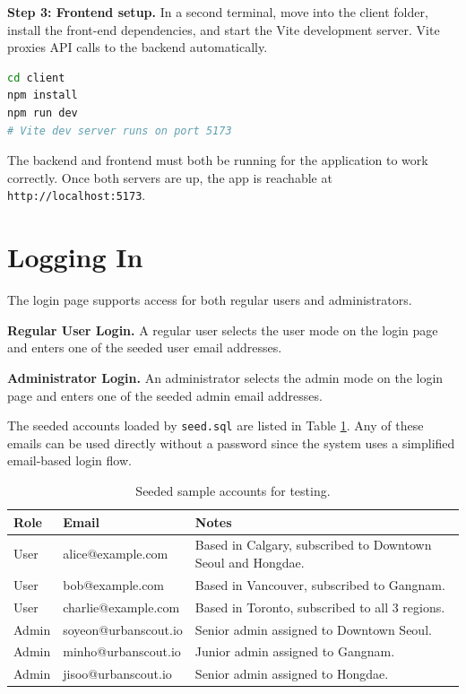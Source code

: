 \documentclass[11pt,letterpaper]{article}
\let\oldtexttt\texttt
\renewcommand{\texttt}[1]{{\color{inlinecode}\oldtexttt{#1}}}
\newcommand{\boldheading}[1]{\needspace{6\baselineskip}\noindent\textbf{#1}}
\begin{document}
\boldheading{Step 3: Frontend setup.} In a second terminal, move into the client folder, install the front-end dependencies, and start the Vite development server. Vite proxies API calls to the backend automatically.

\begin{lstlisting}[language=Bash]
cd client
npm install
npm run dev
# Vite dev server runs on port 5173
\end{lstlisting}

The backend and frontend must both be running for the application to work correctly. Once both servers are up, the app is reachable at \texttt{http://localhost:5173}.

\section{Logging In}

The login page supports access for both regular users and administrators.

\boldheading{Regular User Login.} A regular user selects the user mode on the login page and enters one of the seeded user email addresses.

\boldheading{Administrator Login.} An administrator selects the admin mode on the login page and enters one of the seeded admin email addresses.

The seeded accounts loaded by \texttt{seed.sql} are listed in Table \ref{tab:accounts}. Any of these emails can be used directly without a password since the system uses a simplified email-based login flow.

\begin{table}[H]
    \centering
    \caption{Seeded sample accounts for testing.}
    \label{tab:accounts}
    \begin{tabularx}{\textwidth}{l l X}
        \toprule
        \textbf{Role} & \textbf{Email} & \textbf{Notes} \\
        \midrule
        User  & alice@example.com    & Based in Calgary, subscribed to Downtown Seoul and Hongdae. \\
        User  & bob@example.com      & Based in Vancouver, subscribed to Gangnam. \\
        User  & charlie@example.com  & Based in Toronto, subscribed to all 3 regions. \\
        Admin & soyeon@urbanscout.io & Senior admin assigned to Downtown Seoul. \\
        Admin & minho@urbanscout.io  & Junior admin assigned to Gangnam. \\
        Admin & jisoo@urbanscout.io  & Senior admin assigned to Hongdae. \\
        \bottomrule
    \end{tabularx}
\end{table}
\end{document}

